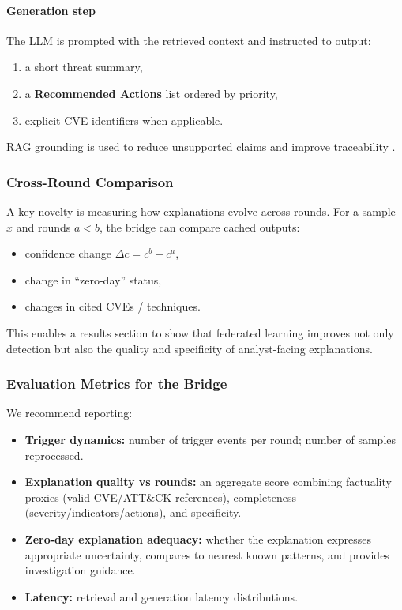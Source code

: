 \documentclass[conference]{IEEEtran}
\begin{document}
\paragraph{Generation step}
The LLM is prompted with the retrieved context and instructed to output:
\begin{enumerate}
  \item a short threat summary,
  \item a \textbf{Recommended Actions} list ordered by priority,
  \item explicit CVE identifiers when applicable.
\end{enumerate}
RAG grounding is used to reduce unsupported claims and improve traceability \cite{Lewis2020RAG}.

\subsubsection{Cross-Round Comparison}
\label{sec:cross-round}

A key novelty is measuring how explanations evolve across rounds. For a sample $x$ and rounds $a<b$, the bridge can compare cached outputs:
\begin{itemize}
  \item confidence change $\Delta c = c^{b}-c^{a}$,
  \item change in ``zero-day'' status,
  \item changes in cited CVEs / techniques.
\end{itemize}
This enables a results section to show that federated learning improves not only detection but also the quality and specificity of analyst-facing explanations.

\subsubsection{Evaluation Metrics for the Bridge}
\label{sec:bridge-metrics}

We recommend reporting:
\begin{itemize}
  \item \textbf{Trigger dynamics:} number of trigger events per round; number of samples reprocessed.
  \item \textbf{Explanation quality vs rounds:} an aggregate score combining factuality proxies (valid CVE/ATT\&CK references), completeness (severity/indicators/actions), and specificity.
  \item \textbf{Zero-day explanation adequacy:} whether the explanation expresses appropriate uncertainty, compares to nearest known patterns, and provides investigation guidance.
  \item \textbf{Latency:} retrieval and generation latency distributions.
\end{itemize}
\end{document}
